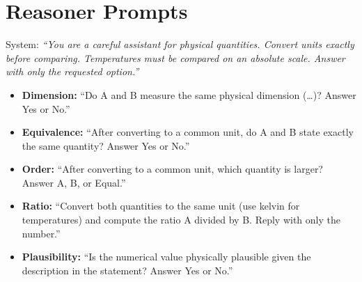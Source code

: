 \documentclass[11pt]{article}
\begin{document}
\section{Reasoner Prompts}
\label{app:prompts}
System: \emph{``You are a careful assistant for physical quantities. Convert units exactly before comparing.
Temperatures must be compared on an absolute scale. Answer with only the requested option.''}
\begin{itemize}[leftmargin=*,itemsep=1pt]
\item \textbf{Dimension:} ``Do A and B measure the same physical dimension (\ldots)? Answer Yes or No.''
\item \textbf{Equivalence:} ``After converting to a common unit, do A and B state exactly the same quantity? Answer Yes or No.''
\item \textbf{Order:} ``After converting to a common unit, which quantity is larger? Answer A, B, or Equal.''
\item \textbf{Ratio:} ``Convert both quantities to the same unit (use kelvin for temperatures) and compute the ratio A
divided by B. Reply with only the number.''
\item \textbf{Plausibility:} ``Is the numerical value physically plausible given the description in the statement?
Answer Yes or No.''
\end{itemize}
\end{document}
